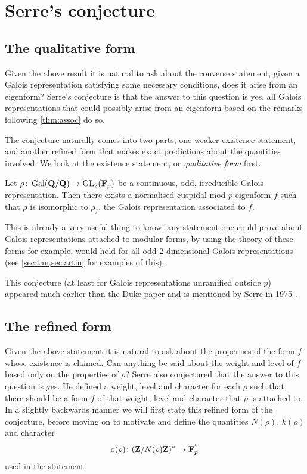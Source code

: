 \documentclass[a4paper,12pt]{article}
\begin{document}


\section{Serre's conjecture}
\subsection{The qualitative form}
Given the above result it is natural to ask about the converse statement, given a Galois representation satisfying some necessary conditions, does it arise from an eigenform?
Serre's conjecture is that the answer to this question is yes, all Galois representations that could possibly arise from an eigenform based on the remarks following \cref{thm:assoc} do so.

The conjecture naturally comes into two parts, one weaker existence statement, and another refined form that makes exact predictions about the quantities involved.
We look at the existence statement, or \emph{qualitative form} first.

\begin{conjecture}\label{conj:qual}
Let $\rho\colon \operatorname{Gal}(\overline{\mathbf{Q}}/\mathbf{Q}) \to \operatorname{GL}_2(\overline{\mathbf{F}}_p)$ be a continuous, odd, irreducible Galois representation.
Then there exists a normalised cuspidal mod $p$ eigenform $f$ such that $\rho$ is isomorphic to $\rho_f$, the Galois representation associated to $f$.
\end{conjecture}

This is already a very useful thing to know: any statement one could prove about Galois representations attached to  modular forms, by using the theory of these forms for example, would hold for all odd 2-dimensional Galois representations (see \cref{sec:tan,sec:artin} for examples of this). %

This conjecture (at least for Galois representations unramified outside $p$) appeared much earlier than the Duke paper and is mentioned by Serre in 1975 \cite[sec. 3]{Serre75}.


\subsection{The refined form}
Given the above statement it is natural to ask about the properties of the form $f$ whose existence is claimed. %
Can anything be said about the weight and level of $f$ based only on the properties of $\rho$?
Serre also conjectured that the answer to this question is yes.
He defined a weight, level and character for each $\rho$ such that there should be a form $f$ of that weight, level and character that $\rho$ is attached to.
In a slightly backwards manner we will first state this refined form of the conjecture, before moving on to motivate and define the quantities $N(\rho)$, $k(\rho)$ and character
\[
\varepsilon(\rho)\colon (\mathbf{Z}/N(\rho)\mathbf{Z})^* \to \overline{\mathbf{F}}_p^*
\]
used in the statement.
\end{document}
